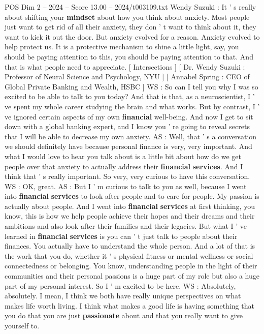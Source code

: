 \begin{textsample}{POS Dim 2 – 2024 – Score 13.00 – 2024/t003109.txt}  \label{ex:f2_pos_036}
Wendy Suzuki : It ' s really about shifting your \textbf{mindset} about how you think about anxiety.
Most people just want to get rid of all their anxiety, they don ' t want to think about it, they want to kick it out the door.
But anxiety evolved for a reason.
Anxiety evolved to help protect us.
It is a protective mechanism to shine a little light, say, you should be paying attention to this, you should be paying attention to that.
And that is what people need to appreciate. [ Intersections ] [ Dr.
Wendy Suzuki : Professor of Neural Science and Psychology, NYU ] [ Annabel Spring : CEO of Global Private Banking and Wealth, HSBC ] WS : So can I tell you why I was so excited to be able to talk to you today?
And that is that, as a neuroscientist, I ' ve spent my whole career studying the brain and what works.
But by contrast, I ' ve ignored certain aspects of my own \textbf{financial} well-being.
And now I get to sit down with a global banking expert, and I know you ' re going to reveal secrets that I will be able to decrease my own anxiety.
AS : Well, that ' s a conversation we should definitely have because personal finance is very, very important.
And what I would love to hear you talk about is a little bit about how do we get people over that anxiety to actually address their \textbf{financial} \textbf{services}.
And I think that ' s really important.
So very, very curious to have this conversation.
WS : OK, great.
AS : But I ' m curious to talk to you as well, because I went into \textbf{financial} \textbf{services} to look after people and to care for people.
My passion is actually about people.
And I went into \textbf{financial} \textbf{services} at first thinking, you know, this is how we help people achieve their hopes and their dreams and their ambitions and also look after their families and their legacies.
But what I ' ve learned in \textbf{financial} \textbf{services} is you can ' t just talk to people about their finances.
You actually have to understand the whole person.
And a lot of that is the work that you do, whether it ' s physical fitness or mental wellness or social connectedness or belonging.
You know, understanding people in the light of their communities and their personal passions is a huge part of my role but also a huge part of my personal interest.
So I ' m excited to be here.
WS : Absolutely, absolutely.
I mean, I think we both have really unique perspectives on what makes life worth living.
I think what makes a good life is having something that you do that you are just \textbf{passionate} about and that you really want to give yourself to.

\end{textsample}
